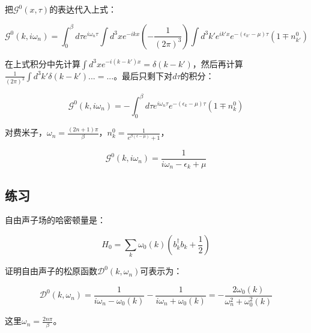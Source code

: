 把$\mathcal{G}^0(x, \tau)$的表达代入上式：

\begin{equation*}
\mathcal{G}^0 (k, i\omega_n)  = \int_0^\beta d \tau e^{i \omega_n \tau} \int d^3 x e^{-i k x} \left( -\frac{1}{(2 \pi)^3 } \right)  \int d^3 k' e^{i k' x } e^{- (\epsilon_{k'} - \mu) \tau} (1 \mp n_{k'}^0)
\end{equation*}

在上式积分中先计算$\int d^3 x e^{-i(k-k')x} = \delta(k-k')$，然后再计算$\frac{1}{(2 \pi)^3}  \int d^3 k' \delta( k - k')... = ...$。最后只剩下对$d \tau$的积分：

\begin{equation*}
\mathcal{G}^0 (k, i \omega_n) = - \int_0^\beta d \tau e^{i \omega_n \tau} e^{-(\epsilon_k - \mu)\tau }(1 \mp n_k^0)
\end{equation*}

对费米子，$\omega_n = \frac{(2n +1 )\pi}{\beta}$，$n_k^0 = \frac{1}{e^{\beta (\epsilon - \mu)} + 1}$，

\begin{equation}
\mathcal{G}^0 (k, i \omega_n) = \frac{1}{i \omega_n - \epsilon_k + \mu}
\end{equation}


\subsection*{练习}

自由声子场的哈密顿量是：

\begin{equation}
H_0 = \sum\limits_k \omega_0 (k) \left( b^\dagger_k b_k + \frac{1}{2} \right)
\end{equation}


证明自由声子的松原函数$\mathcal{D}^0(k, \omega_n)$可表示为：

\begin{equation}
\mathcal{D}^0 (k, \omega_n) = \frac{1}{i \omega_n - \omega_0(k)} - \frac{1}{i \omega_n + \omega_0(k)} = - \frac{2 \omega_0 (k)}{  \omega_n^2 + \omega_0^2(k)  }
\end{equation}

这里$\omega_n = \frac{2 n \pi}{\beta}$。